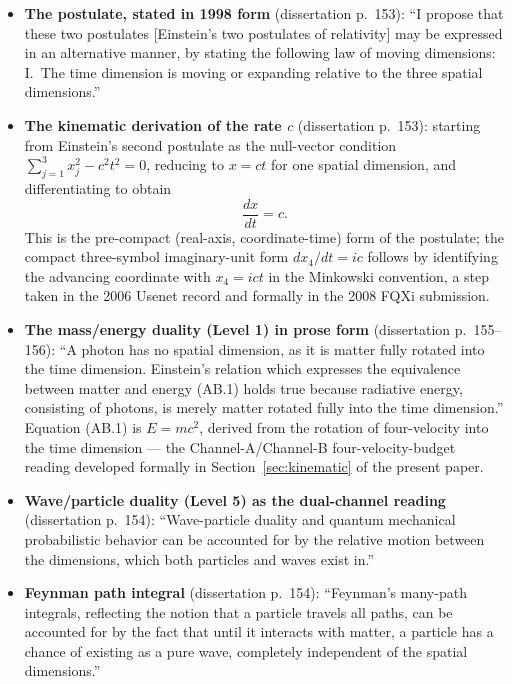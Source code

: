 \documentclass[11pt,a4paper]{article}
\begin{document}
\begin{itemize}
\item \textbf{The postulate, stated in 1998 form} (dissertation p.\ 153): ``I propose that these two postulates [Einstein's two postulates of relativity] may be expressed in an alternative manner, by stating the following law of moving dimensions: I.\ The time dimension is moving or expanding relative to the three spatial dimensions.''

\item \textbf{The kinematic derivation of the rate $c$} (dissertation p.\ 153): starting from Einstein's second postulate as the null-vector condition $\sum_{j=1}^{3} x_j^2 - c^2 t^2 = 0$, reducing to $x = ct$ for one spatial dimension, and differentiating to obtain
\[
\frac{dx}{dt} = c.
\]
This is the pre-compact (real-axis, coordinate-time) form of the postulate; the compact three-symbol imaginary-unit form $dx_4/dt = ic$ follows by identifying the advancing coordinate with $x_4 = ict$ in the Minkowski convention, a step taken in the 2006 Usenet record and formally in the 2008 FQXi submission.

\item \textbf{The mass/energy duality (Level 1) in prose form} (dissertation p.\ 155--156): ``A photon has no spatial dimension, as it is matter fully rotated into the time dimension. Einstein's relation which expresses the equivalence between matter and energy (AB.1) holds true because radiative energy, consisting of photons, is merely matter rotated fully into the time dimension.'' Equation (AB.1) is $E = mc^2$, derived from the rotation of four-velocity into the time dimension --- the Channel-A/Channel-B four-velocity-budget reading developed formally in Section~\ref{sec:kinematic} of the present paper.

\item \textbf{Wave/particle duality (Level 5) as the dual-channel reading} (dissertation p.\ 154): ``Wave-particle duality and quantum mechanical probabilistic behavior can be accounted for by the relative motion between the dimensions, which both particles and waves exist in.''

\item \textbf{Feynman path integral} (dissertation p.\ 154): ``Feynman's many-path integrals, reflecting the notion that a particle travels all paths, can be accounted for by the fact that until it interacts with matter, a particle has a chance of existing as a pure wave, completely independent of the spatial dimensions.''


\end{itemize}
\end{document}
